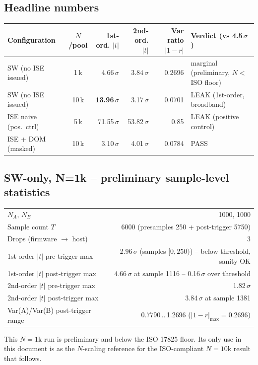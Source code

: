 \documentclass[11pt]{article}
\begin{document}
\subsection{Headline numbers}

\begin{tabularx}{\linewidth}{@{}l c r r r l@{}}
\toprule
Configuration & $N$/pool & 1st-ord. $|t|$ & 2nd-ord. $|t|$ & Var ratio $|1-r|$ & Verdict (vs 4.5\,$\sigma$) \\
\midrule
SW (no ISE issued)     & 1\,k  & 4.66\,$\sigma$  & 3.84\,$\sigma$  & 0.2696 & marginal (preliminary, $N <$ ISO floor) \\
SW (no ISE issued)     & 10\,k & \textbf{13.96\,$\sigma$} & 3.17\,$\sigma$ & 0.0701 & LEAK (1st-order, broadband) \\
ISE naive (pos.\ ctrl) & 5\,k  & 71.55\,$\sigma$ & 53.82\,$\sigma$ & 0.85   & LEAK (positive control) \\
ISE + DOM (masked)     & 10\,k & 3.10\,$\sigma$  & 4.01\,$\sigma$  & 0.0784 & PASS \\
\bottomrule
\end{tabularx}

\subsection{SW-only, N=1k -- preliminary sample-level statistics}

\begin{tabularx}{\linewidth}{@{}lr@{}}
\toprule
$N_A$, $N_B$              & 1000, 1000 \\
Sample count $T$          & 6000 (presamples 250 + post-trigger 5750) \\
Drops (firmware $\to$ host) & 3 \\
1st-order $|t|$ pre-trigger max  & 2.96\,$\sigma$ (samples $[0,250)$) -- below threshold, sanity OK \\
1st-order $|t|$ post-trigger max & 4.66\,$\sigma$ at sample 1116 -- 0.16\,$\sigma$ over threshold \\
2nd-order $|t|$ pre-trigger max  & 1.82\,$\sigma$ \\
2nd-order $|t|$ post-trigger max & 3.84\,$\sigma$ at sample 1381 \\
Var(A)/Var(B) post-trigger range & 0.7790\,..\,1.2696 ($|1-r|_{\max}=0.2696$) \\
\bottomrule
\end{tabularx}

This $N{=}1$k run is preliminary and below the ISO 17825 floor. Its only use
in this document is as the $N$-scaling reference for the ISO-compliant
$N{=}10$k result that follows.
\end{document}
